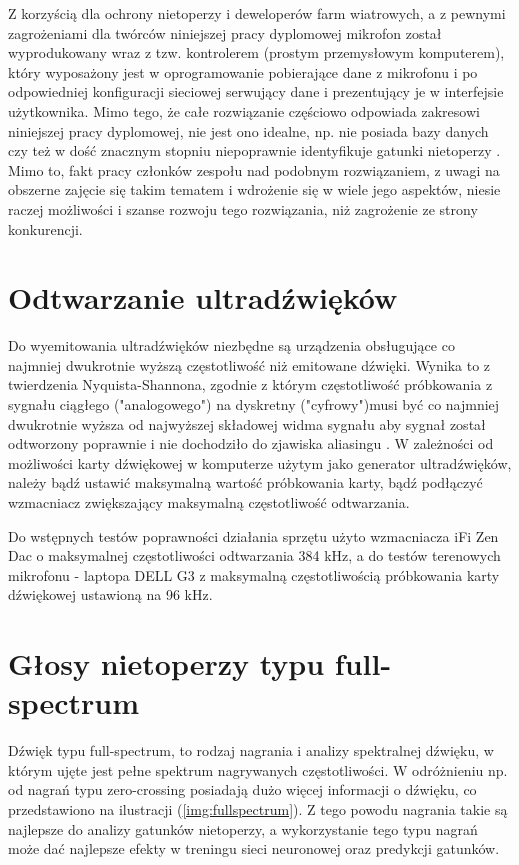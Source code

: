 \documentclass{sprz}
\begin{document}
Z korzyścią dla ochrony nietoperzy i deweloperów farm wiatrowych, a z pewnymi zagrożeniami dla twórców niniejszej pracy dyplomowej mikrofon został wyprodukowany wraz z tzw. kontrolerem (prostym przemysłowym komputerem), który wyposażony jest w oprogramowanie pobierające dane z mikrofonu i po odpowiedniej konfiguracji sieciowej serwujący dane i prezentujący je w interfejsie użytkownika. Mimo tego, że całe rozwiązanie częściowo odpowiada zakresowi niniejszej pracy dyplomowej, nie jest ono idealne, np. nie posiada bazy danych czy też w dość znacznym stopniu niepoprawnie identyfikuje gatunki nietoperzy \cite{kaleidoscope-bias}. Mimo to, fakt pracy członków zespołu nad podobnym rozwiązaniem, z uwagi na obszerne zajęcie się takim tematem i wdrożenie się w wiele jego aspektów, niesie raczej możliwości i szanse rozwoju tego rozwiązania, niż zagrożenie ze strony konkurencji.

\section{Odtwarzanie ultradźwięków}
Do wyemitowania ultradźwięków niezbędne są urządzenia obsługujące co najmniej dwukrotnie wyższą częstotliwość niż emitowane dźwięki. Wynika to z twierdzenia Nyquista-Shannona, zgodnie z którym częstotliwość próbkowania z sygnału ciągłego ("analogowego") na dyskretny ("cyfrowy")musi być co najmniej dwukrotnie wyższa od najwyższej składowej widma sygnału aby sygnał został odtworzony poprawnie i nie dochodziło do zjawiska aliasingu \cite{probkowanie}. W zależności od możliwości karty dźwiękowej w komputerze użytym jako generator ultradźwięków, należy bądź ustawić maksymalną wartość próbkowania karty, bądź podłączyć wzmacniacz zwiększający maksymalną częstotliwość odtwarzania.

Do wstępnych testów poprawności działania sprzętu użyto wzmacniacza iFi Zen Dac o maksymalnej częstotliwości odtwarzania 384 kHz, a do testów terenowych mikrofonu - laptopa DELL G3 z maksymalną częstotliwością próbkowania karty dźwiękowej ustawioną na 96 kHz.

\section{Głosy nietoperzy typu full-spectrum}
Dźwięk typu full-spectrum, to rodzaj nagrania i analizy spektralnej dźwięku, w którym ujęte jest pełne spektrum nagrywanych częstotliwości. W odróżnieniu np. od nagrań typu zero-crossing posiadają dużo więcej informacji o dźwięku, co przedstawiono na ilustracji (\ref{img:fullspectrum}). Z tego powodu nagrania takie są najlepsze do analizy gatunków nietoperzy, a wykorzystanie tego typu nagrań może dać najlepsze efekty w treningu sieci neuronowej oraz predykcji gatunków.
\end{document}
